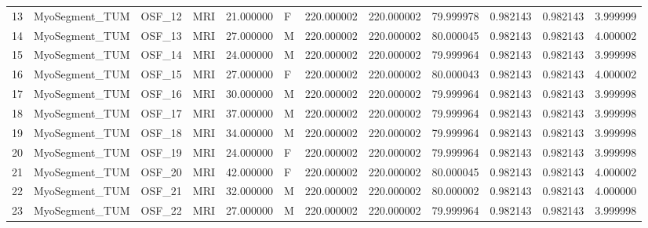 \begin{tabular}{llllrlrrrrrr}
13     &  MyoSegment\_TUM &       OSF\_12 &                MRI &  21.000000 &        F &       220.000002 &    220.000002 &   79.999978 &               0.982143 &            0.982143 &          3.999999 \\
14     &  MyoSegment\_TUM &       OSF\_13 &                MRI &  27.000000 &        M &       220.000002 &    220.000002 &   80.000045 &               0.982143 &            0.982143 &          4.000002 \\
15     &  MyoSegment\_TUM &       OSF\_14 &                MRI &  24.000000 &        M &       220.000002 &    220.000002 &   79.999964 &               0.982143 &            0.982143 &          3.999998 \\
16     &  MyoSegment\_TUM &       OSF\_15 &                MRI &  27.000000 &        F &       220.000002 &    220.000002 &   80.000043 &               0.982143 &            0.982143 &          4.000002 \\
17     &  MyoSegment\_TUM &       OSF\_16 &                MRI &  30.000000 &        M &       220.000002 &    220.000002 &   79.999964 &               0.982143 &            0.982143 &          3.999998 \\
18     &  MyoSegment\_TUM &       OSF\_17 &                MRI &  37.000000 &        M &       220.000002 &    220.000002 &   79.999964 &               0.982143 &            0.982143 &          3.999998 \\
19     &  MyoSegment\_TUM &       OSF\_18 &                MRI &  34.000000 &        M &       220.000002 &    220.000002 &   79.999964 &               0.982143 &            0.982143 &          3.999998 \\
20     &  MyoSegment\_TUM &       OSF\_19 &                MRI &  24.000000 &        F &       220.000002 &    220.000002 &   79.999964 &               0.982143 &            0.982143 &          3.999998 \\
21     &  MyoSegment\_TUM &       OSF\_20 &                MRI &  42.000000 &        F &       220.000002 &    220.000002 &   80.000045 &               0.982143 &            0.982143 &          4.000002 \\
22     &  MyoSegment\_TUM &       OSF\_21 &                MRI &  32.000000 &        M &       220.000002 &    220.000002 &   80.000002 &               0.982143 &            0.982143 &          4.000000 \\
23     &  MyoSegment\_TUM &       OSF\_22 &                MRI &  27.000000 &        M &       220.000002 &    220.000002 &   79.999964 &               0.982143 &            0.982143 &          3.999998 \\

\end{tabular}
